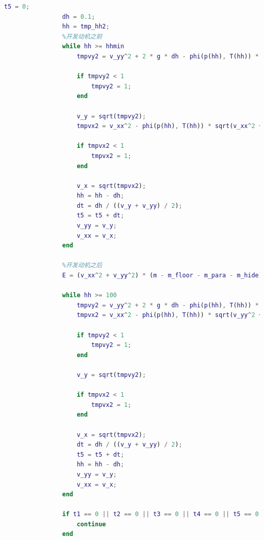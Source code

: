 \documentclass[hyperref,a4paper,UTF8]{ctexart}
\begin{document}
\begin{lstlisting}[language=Matlab]
                t5 = 0;
                dh = 0.1;
                hh = tmp_hh2;
                %开发动机之前
                while hh >= hhmin
                    tmpvy2 = v_yy^2 + 2 * g * dh - phi(p(hh), T(hh)) * sqrt(v_yy^2 + v_xx^2) * (S_floor + S_para) * dh * v_yy / (m - m_floor - m_para - m_hide);

                    if tmpvy2 < 1
                        tmpvy2 = 1;
                    end

                    v_y = sqrt(tmpvy2);
                    tmpvx2 = v_xx^2 - phi(p(hh), T(hh)) * sqrt(v_xx^2 + v_yy^2) * (S_floor + S_para) * dh * v_xx^2 / ((m - m_floor - m_para - m_hide) * v_yy);

                    if tmpvx2 < 1
                        tmpvx2 = 1;
                    end

                    v_x = sqrt(tmpvx2);
                    hh = hh - dh;
                    dt = dh / ((v_y + v_yy) / 2);
                    t5 = t5 + dt;
                    v_yy = v_y;
                    v_xx = v_x;
                end

                %开发动机之后
                E = (v_xx^2 + v_yy^2) * (m - m_floor - m_para - m_hide) / 2 + (m - m_floor - m_para - m_hide) * g * hh;

                while hh >= 100
                    tmpvy2 = v_yy^2 + 2 * g * dh - phi(p(hh), T(hh)) * sqrt(v_yy^2 + v_xx^2) * S_floor * dh * v_yy / (m - m_floor - m_para - m_hide) - 2 * 7500 * dh * v_yy / ((m - m_floor - m_para - m_hide) * sqrt(v_yy^2 + v_xx^2));
                    tmpvx2 = v_xx^2 - phi(p(hh), T(hh)) * sqrt(v_yy^2 + v_xx^2) * S_floor * dh * v_xx^2 / (v_yy * (m - m_floor - m_para - m_hide)) - 2 * 7500 * dh * v_xx^2 / (v_yy * sqrt(v_yy^2 + v_xx^2) * (m - m_floor - m_para - m_hide));

                    if tmpvy2 < 1
                        tmpvy2 = 1;
                    end

                    v_y = sqrt(tmpvy2);

                    if tmpvx2 < 1
                        tmpvx2 = 1;
                    end

                    v_x = sqrt(tmpvx2);
                    dt = dh / ((v_y + v_yy) / 2);
                    t5 = t5 + dt;
                    hh = hh - dh;
                    v_yy = v_y;
                    v_xx = v_x;
                end

                if t1 == 0 || t2 == 0 || t3 == 0 || t4 == 0 || t5 == 0
                    continue
                end


\end{lstlisting}
\end{document}
